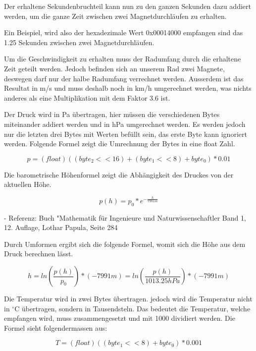 Der erhaltene Sekundenbruchteil kann nun zu den ganzen Sekunden dazu addiert werden, um die ganze Zeit zwischen zwei Magnetdurchläufen zu erhalten.

Ein Beispiel, wird also der hexadezimale Wert 0x00014000 empfangen sind das 1.25 Sekunden zwischen zwei Magnetdurchläufen.

Um die Geschwindigkeit zu erhalten muss der Radumfang durch die erhaltene Zeit geteilt werden. Jedoch befinden sich an unserem Rad zwei Magnete, deswegen darf nur der halbe Radumfang verrechnet werden. Ausserdem ist das Resultat in m/s und muss deshalb noch in km/h umgerechnet werden, was nichts anderes als eine Multiplikation mit dem Faktor 3.6 ist.

Der Druck wird in Pa übertragen, hier müssen die verschiedenen Bytes miteinander addiert werden und in hPa umgerechnet werden. Es werden jedoch nur die letzten drei Bytes mit Werten befüllt sein, das erste Byte kann ignoriert werden. Folgende Formel zeigt die Umrechnung der Bytes in eine float Zahl.

\begin{equation}
	p = (float)((byte_2 << 16) + (byte_1 << 8) + byte_0) * 0.01
\end{equation}

Die barometrische Höhenformel zeigt die Abhängigkeit des Druckes von der aktuellen Höhe.

\begin{equation}
	p(h) = p_0 * e^{-\frac{h}{7991 m}}
\end{equation}

- Referenz: Buch "Mathematik für Ingenieure und Naturwissenschaftler Band 1, 12. Auflage, Lothar Papula, Seite 284

Durch Umformen ergibt sich die folgende Formel, womit sich die Höhe aus dem Druck berechnen lässt.

\begin{equation}
	h = ln(\frac{p(h)}{p_0}) * (-7991 m) = ln(\frac{p(h)}{1013.25 hPa}) * (-7991 m)
\end{equation}

Die Temperatur wird in zwei Bytes übertragen. jedoch wird die Temperatur nicht in $^\circ$C übertragen, sondern in Tausendsteln. Das bedeutet die Temperatur, welche empfangen wird, muss zusammengesetzt und mit 1000 dividiert werden. Die Formel sieht folgendermassen aus:

\begin{equation}
	T = (float)((byte_1 << 8) + byte_0) * 0.001
\end{equation}

